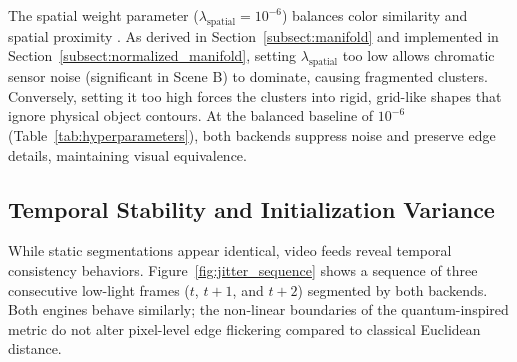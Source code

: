 The spatial weight parameter ($\lambda_{\text{spatial}} = 10^{-6}$) balances color similarity and spatial proximity \cite{achanta2012slic, shi2000normalized}. As derived in Section~\ref{subsect:manifold} and implemented in Section~\ref{subsect:normalized_manifold}, setting $\lambda_{\text{spatial}}$ too low allows chromatic sensor noise (significant in Scene B) to dominate, causing fragmented clusters. Conversely, setting it too high forces the clusters into rigid, grid-like shapes that ignore physical object contours. At the balanced baseline of $10^{-6}$ (Table~\ref{tab:hyperparameters}), both backends suppress noise and preserve edge details, maintaining visual equivalence.

\subsection{Temporal Stability and Initialization Variance}
While static segmentations appear identical, video feeds reveal temporal consistency behaviors. Figure~\ref{fig:jitter_sequence} shows a sequence of three consecutive low-light frames ($t$, $t+1$, and $t+2$) segmented by both backends. Both engines behave similarly; the non-linear boundaries of the quantum-inspired metric do not alter pixel-level edge flickering compared to classical Euclidean distance.

